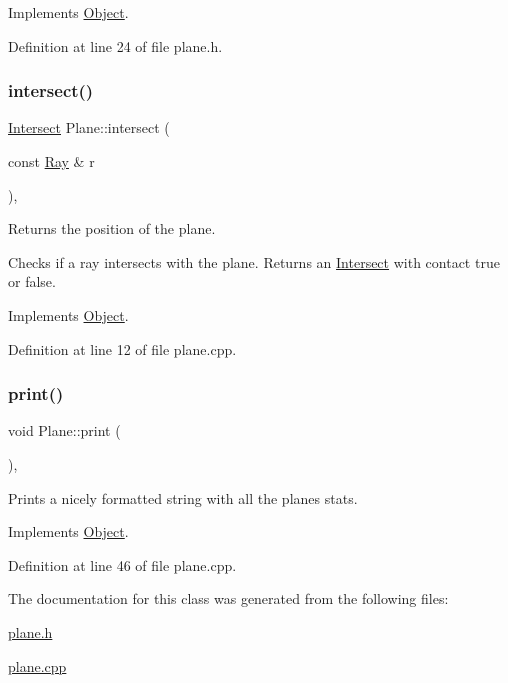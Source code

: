 Implements \mbox{\hyperlink{class_object_ac29e04a255155b791d69b97820423efa}{Object}}.



Definition at line 24 of file plane.\+h.

\mbox{\label{class_plane_a76cf36bbdaaed72e59aa7ecd9dcb9dba}} 
\subsubsection{\texorpdfstring{intersect()}{intersect()}}
{\footnotesize\ttfamily \mbox{\hyperlink{struct_intersect}{Intersect}} Plane\+::intersect (\begin{DoxyParamCaption}\item[{const \mbox{\hyperlink{struct_ray}{Ray}} \&}]{r }\end{DoxyParamCaption})\hspace{0.3cm}{\ttfamily [override]}, {\ttfamily [virtual]}}



Returns the position of the plane. 

Checks if a ray intersects with the plane. Returns an \mbox{\hyperlink{struct_intersect}{Intersect}} with contact true or false. 

Implements \mbox{\hyperlink{class_object_a27b26f69f1fcb4dc72eca40ac0d20ea6}{Object}}.



Definition at line 12 of file plane.\+cpp.

\mbox{\label{class_plane_a3d9139793b931279e3dcd1fd80a263c7}} 
\subsubsection{\texorpdfstring{print()}{print()}}
{\footnotesize\ttfamily void Plane\+::print (\begin{DoxyParamCaption}{ }\end{DoxyParamCaption})\hspace{0.3cm}{\ttfamily [override]}, {\ttfamily [virtual]}}



Prints a nicely formatted string with all the plane\textquotesingle{}s stats. 



Implements \mbox{\hyperlink{class_object_ad81452e5a38455eff025d85ef1da7307}{Object}}.



Definition at line 46 of file plane.\+cpp.



The documentation for this class was generated from the following files\+:\begin{DoxyCompactItemize}
\item 
\mbox{\hyperlink{plane_8h}{plane.\+h}}\item 
\mbox{\hyperlink{plane_8cpp}{plane.\+cpp}}\end{DoxyCompactItemize}
